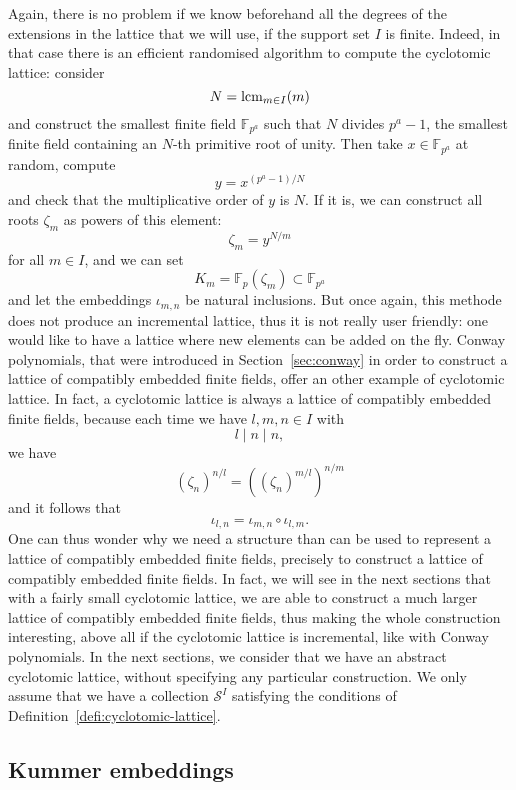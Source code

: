 Again, there is no problem if we know beforehand all the degrees of the
extensions in the lattice that we will use, \ie if the support set $I$ is
finite. Indeed, in that case there is an efficient randomised algorithm to
compute the cyclotomic lattice: consider
\[
  N = \operatorname{lcm}_{m\in I}(m)
\]
and construct the smallest finite field $\mathbb{F}_{p^a}$ such that $N$ divides
$p^a-1$, \ie the smallest finite field containing an $N$-th primitive root of
unity. Then take $x\in\mathbb{F}_{p^a}$ at random, compute 
\[
  y=x^{(p^a-1)/N}
\]
and check that the multiplicative order of $y$ is $N$. If it is, we can
construct all roots $\zeta_m$ as powers of this element:
\[
  \zeta_m = y^{N/m}
\]
for all $m\in I$, and we can set
\[
  K_m = \mathbb{F}_p(\zeta_m)\subset \mathbb{F}_{p^a}
\]
and let the embeddings $\iota_{m, n}$ be natural inclusions. But once again,
this methode does not produce an incremental lattice, thus it is not really user
friendly: one would like to have a lattice where new elements can be added on
the fly. Conway polynomials, that were introduced in
Section~\ref{sec:conway} in order to construct a lattice of
compatibly embedded finite fields, offer an other example of cyclotomic lattice. In
fact, a cyclotomic lattice is always a lattice of compatibly embedded finite
fields, because each time we have $l, m, n\in I$ with
\[
  l\mid n\mid n,
\]
we have
\[
  (\zeta_n)^{n/l} = ((\zeta_n)^{m/l})^{n/m}
\]
and it follows that
\[
  \iota_{l, n} = \iota_{m, n}\circ\iota_{l, m}.
\]
One can thus wonder why we need a structure than can be used to represent a
lattice of compatibly embedded finite fields, precisely to construct a lattice
of compatibly embedded finite fields. In fact, we will see in the next sections
that with a fairly small cyclotomic lattice, we are able to construct a much larger
lattice of compatibly embedded finite fields, thus making the whole construction
interesting, above all if the cyclotomic lattice is incremental, like with
Conway polynomials. In the next sections, we consider that we have an abstract
cyclotomic lattice, without specifying any particular construction. We only
assume that we have a collection $\mathcal S^I$ satisfying the conditions of
Definition~\ref{defi:cyclotomic-lattice}.

\subsection{Kummer embeddings}
\label{sec:kummer-embeddings}

